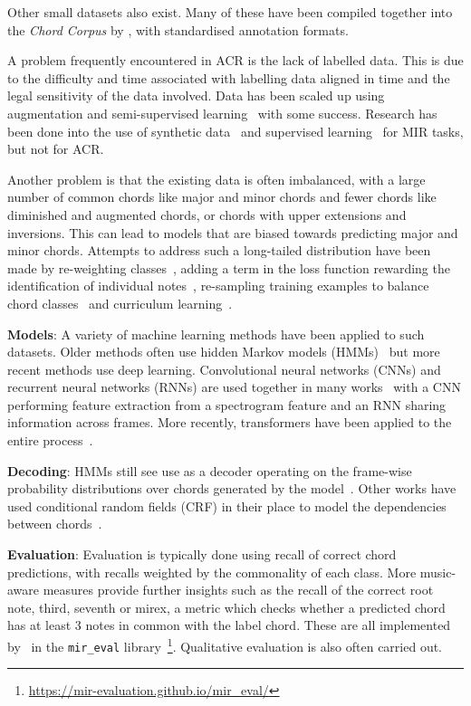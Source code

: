 Other small datasets also exist. Many of these have been compiled together into the \emph{Chord Corpus} by \citet{Choco}, with standardised annotation formats.

A problem frequently encountered in ACR is the lack of labelled data. This is due to the difficulty and time associated with labelling data aligned in time and the legal sensitivity of the data involved. Data has been scaled up using augmentation and semi-supervised learning~\citep{ScalingUpSemiSupervisedLearning} with some success. Research has been done into the use of synthetic data~\citep{MusicGenTrainingData,AnnotationFreeSyntheticData} and supervised learning~\citep{MERTSupervisedLearning} for MIR tasks, but not for ACR. 

Another problem is that the existing data is often imbalanced, with a large number of common chords like major and minor chords and fewer chords like diminished and augmented chords, or chords with upper extensions and inversions. This can lead to models that are biased towards predicting major and minor chords. Attempts to address such a long-tailed distribution have been made by re-weighting classes~\citep{ACRLargeVocab1}, adding a term in the loss function rewarding the identification of individual notes~\citep{StructuredTraining,ACRLargeVocab1}, re-sampling training examples to balance chord classes~\citep{BalanceRandomForestACR} and curriculum learning~\citep{CurriculumLearning}.

\textbf{Models}: A variety of machine learning methods have been applied to such datasets. Older methods often use hidden Markov models (HMMs)~\citep{ACRHMM} but more recent methods use deep learning. Convolutional neural networks (CNNs) and recurrent neural networks (RNNs) are used together in many works~\citep{ACRCNNRNN1,ACRLargeVocab1,StructuredTraining} with a CNN performing feature extraction from a spectrogram feature and an RNN sharing information across frames. More recently, transformers have been applied to the entire process~\citet{MelodyTranscriptionViaGenerativePreTraining, HarmonyTransformer, AttendToChords}.

\textbf{Decoding}: HMMs still see use as a decoder operating on the frame-wise probability distributions over chords generated by the model~\citep{BalanceRandomForestACR}. Other works have used conditional random fields (CRF) in their place to model the dependencies between chords~\citep{ACRLargeVocab1}.

\textbf{Evaluation}: Evaluation is typically done using recall of correct chord predictions, with recalls weighted by the commonality of each class. More music-aware measures provide further insights such as the recall of the correct root note, third, seventh or mirex, a metric which checks whether a predicted chord has at least 3 notes in common with the label chord. These are all implemented by~\citet{mir_eval} in the \texttt{mir\_eval} library~\footnote{\url{https://mir-evaluation.github.io/mir_eval/}}. Qualitative evaluation is also often carried out.

